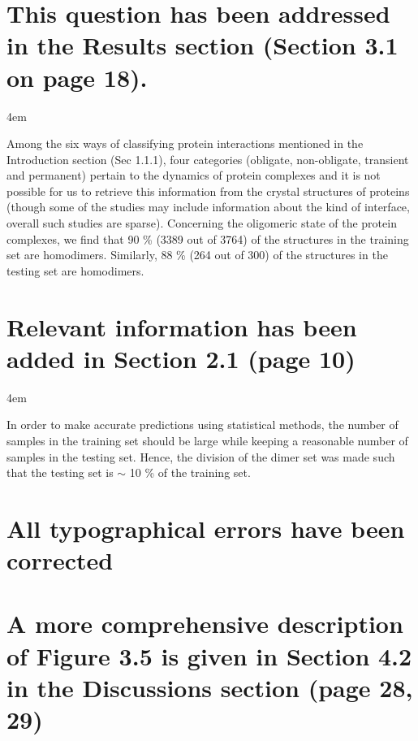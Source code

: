 \documentclass[a4paper, 12pt, twoside]{article}
\begin{document}
\section{This question has been addressed in the Results section (Section 3.1 on page 18).}

\par
\begingroup
\footnotesize
\leftskip4em
\rightskip\leftskip

Among the six ways of classifying protein interactions mentioned in the Introduction section (Sec 1.1.1), four categories (obligate, non-obligate, transient and permanent) pertain to the dynamics of protein complexes and it is not possible for us to retrieve this information from the crystal structures of proteins (though some of the studies may include information about the kind of interface, overall such studies are sparse). Concerning the oligomeric state of the protein complexes, we find that 90 \% (3389 out of 3764) of the structures in the training set are homodimers. Similarly, 88 \% (264 out of 300) of the structures in the testing set are homodimers.
\par
\endgroup

\section{Relevant information has been added in Section 2.1 (page 10)}

\par
\begingroup
\footnotesize
\leftskip4em
\rightskip\leftskip

In order to make accurate predictions using statistical methods, the number of samples in the training set should be large while keeping a reasonable number of samples in the testing set. Hence, the division of the dimer set was made such that the testing set is $\sim$ 10 \% of the training set.

\par
\endgroup

\section{All typographical errors have been corrected}

\section{A more comprehensive description of Figure 3.5 is given in Section 4.2 in the Discussions section (page 28, 29)}
\end{document}
